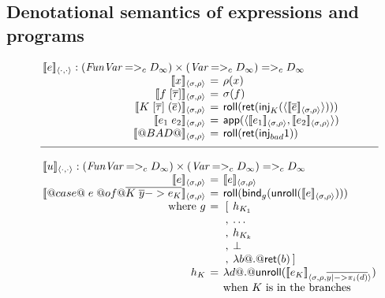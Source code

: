 \subsection{Denotational semantics of expressions and programs}

\begin{figure}
$$
\setlength{\arraycolsep}{2pt}
\begin{array}{c}
\begin{array}{rcl}
\multicolumn{3}{l}{\interp{e}{\cdot}{\cdot} : (\FVarCpo =>_c D_{\infty}) \times (\VarCpo =>_c D_{\infty}) =>_c D_{\infty}} \\
  \interp{x}{\sigma}{\rho} & = & \rho(x) \\ 
  \interp{f\;[\taus]}{\sigma}{\rho} & = & \sigma(f) \\
  \interp{K\;[\taus]\;(\ol{e})}{\sigma}{\rho} & = & \roll(\ret(\inj{K}(\langle\interp{\ol{e}}{\sigma}{\rho}\rangle))) \\ 
  \interp{e_1\;e_2}{\sigma}{\rho} & = & \dapp(\langle \interp{e_1}{\sigma}{\rho}, \interp{e_2}{\sigma}{\rho}\rangle) \\ 
  \interp{@BAD@}{\sigma}{\rho} & = & \roll(\ret(\inj{bad}1)) \\[2mm] 
\hline \\
\multicolumn{3}{l}{\interp{u}{\cdot}{\cdot} : (\FVarCpo =>_c D_{\infty}) \times (\VarCpo =>_c D_{\infty}) =>_c D_{\infty}} \\
  \interp{e}{\sigma}{\rho} & = & \interp{e}{\sigma}{\rho} \\
  \interp{@case@\;e\;@of@ \ol{ K\;\ys -> e_K}}{\sigma}{\rho} 
          & = & \roll(\bind_{g} (\unroll(\interp{e}{\sigma}{\rho}))) \\ 
  \text{ where } g  & = & \begin{array}[t]{ll} 
                             [ & h_{K_1} \\
                             , & \ldots \\
                             , & h_{K_k} \\
                             , & \bot \\ 
                             , & \dlambda b @.@ \ret(b) \hspace{2pt} ] 
                           \end{array} \\ 
              h_{K} & =  & \dlambda d @.@ \unroll(\interp{e_K}{\sigma}{\rho, \ol{y |-> \pi_i(d)}}) \\ 
                    &   &  \text{when } K \text{ is in the branches} \\

\end{array}
\end{array}$$
\end{figure}
